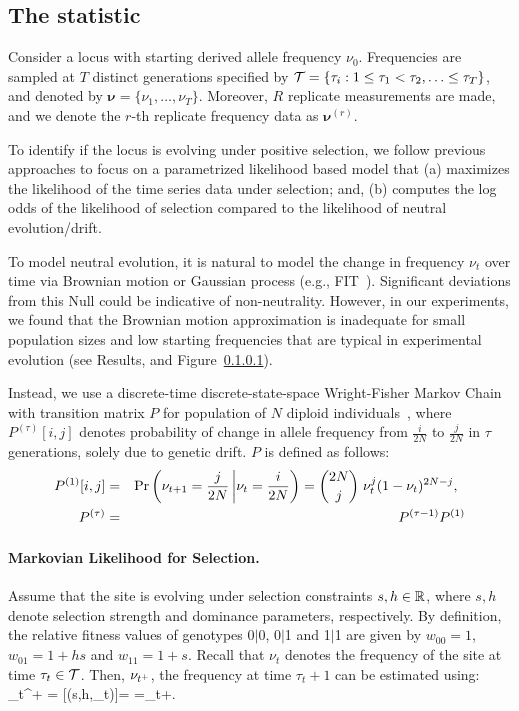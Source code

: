 \documentclass[11pt]{article}
\def\comale{\text{COMALE }}
\begin{document}
\subsection{The \comale statistic}
Consider a locus with starting derived allele frequency
$\nu_0$. Frequencies are sampled at $T$ distinct generations specified
by ${\cal T}= \{\tau_i: 1\le \tau_1<\tau_2,\ldots\le \tau_T\}$, and
denoted by $\bm{\nu}=\{\nu_1,\ldots,\nu_T\}$. Moreover, $R$ replicate
measurements are made, and we denote the $r$-th replicate frequency
data as $\bm{\nu}^{(r)}$.

To identify if the locus is evolving under positive selection, we
follow previous approaches to focus on a parametrized likelihood based
model that (a) maximizes the likelihood of the time series data under
selection; and, (b) computes the log odds of the likelihood of
selection compared to the likelihood of neutral evolution/drift.

To model neutral evolution, it is natural to model the change in
frequency $\nu_t$ over time via Brownian motion or Gaussian process
(e.g., FIT~\cite{}). Significant deviations from this Null could be
indicative of non-neutrality. However, in our experiments, we found
that the Brownian motion approximation is inadequate for small
population sizes and low starting frequencies that are typical in
experimental evolution (see Results, and Figure~\ref{}).

Instead, we use a discrete-time discrete-state-space Wright-Fisher
Markov Chain with transition matrix $P$ for population of $N$ diploid
individuals~\cite{Ewens2012Mathematical}, where $P^{(\tau)}[i,j]$
denotes probability of change in allele frequency from $\frac{i}{2N}$
to $\frac{j}{2N}$ in $\tau$ generations, solely due to genetic
drift. $P$ is defined as follows:
\begin{eqnarray}
  P^{(1)}[i,j] &=& \operatorname{Pr}\left(\nu_{t+1}=\frac{j}{2N} \left|
      \nu_{t}=\frac{i}{2N}\right)={2N \choose j} \right.  \nu_{t}^j
  (1-\nu_{t})^{2N-j}, \;\;\\
  P^{(\tau)} &=&   P^{(\tau-1)}P^{(1)}\\
\end{eqnarray}

\paragraph{Markovian Likelihood for Selection.}
Assume that the site is evolving under selection constraints $s,h\in
{\mathbb R}$, where $s,h$ denote selection strength and dominance parameters,
respectively. By definition, the relative fitness values of genotypes
0$|$0, 0$|$1 and 1$|$1 are given by $w_{00}=1$, $w_{01}=1+hs$ and
$w_{11}=1+s$. Recall that $\nu_t$ denotes the frequency of the site at
time $\tau_t\in {\cal T}$. Then, $\nu_{t^+}$, the frequency at time
$\tau_t+1$ can be estimated using: 
\beq \hat{\nu}_{t^+} =
[\nusp(s,h,\nu_t)]=
=\nu_t+.
  \label{eq:transition}
\eeq
\end{document}
